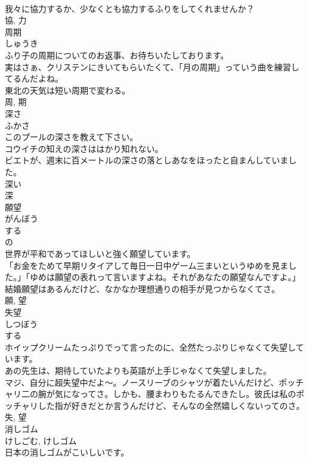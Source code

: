 \documentclass[8pt]{extreport}
\begin{document}
\begin{CJK}{UTF8}{min}
\\	我々に協力するか、少なくとも協力するふりをしてくれませんか？	
\\	協, 力	
\\	周期	
\\	しゅうき	
\\	ふり子の周期についてのお返事、お待ちいたしております。	
\\	実はさぁ、クリステンにきいてもらいたくて、「月の周期」っていう曲を練習してるんだよね。	
\\	東北の天気は短い周期で変わる。	
\\	周, 期	
\\	深さ	
\\	ふかさ	
\\	このプールの深さを教えて下さい。	
\\	コウイチの知えの深さははかり知れない。	
\\	ビエトが、週末に百メートルの深さの落としあなをほったと自まんしていました。	
\\	深い 
\\	深	
\\	願望	
\\	がんぼう	
\\	する 
\\	の 
\\	世界が平和であってほしいと強く願望しています。	
\\	「お金をためて早期リタイアして毎日一日中ゲーム三まいというゆめを見ました。」「ゆめは願望の表れって言いますよね。それがあなたの願望なんですよ。」	
\\	結婚願望はあるんだけど、なかなか理想通りの相手が見つからなくてさ。	
\\	願, 望	
\\	失望	
\\	しつぼう	
\\	する 
\\	ホイップクリームたっぷりでって言ったのに、全然たっぷりじゃなくて失望しています。	
\\	あの先生は、期待していたよりも英語が上手じゃなくて失望しました。	
\\	マジ、自分に超失望中だよ〜。ノースリーブのシャツが着たいんだけど、ポッチャリ二の腕が気になってさ。しかも、腰まわりもたるんできたし。彼氏は私のポッチャリした指が好きだとか言うんだけど、そんなの全然嬉しくないってのさ。	
\\	失, 望	
\\	消しゴム	
\\	けしごむ, けしゴム	
\\	日本の消しゴムがこいしいです。	

\end{CJK}
\end{document}

